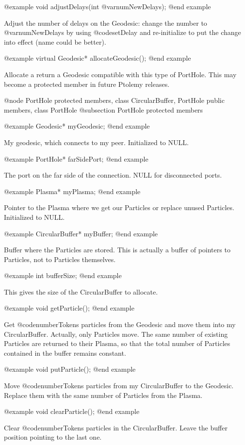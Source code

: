 @example
void adjustDelays(int @var{numNewDelays});
@end example

Adjust the number of delays on the Geodesic: change the number to
@var{numNewDelays} by using @code{setDelay} and re-initialize to
put the change into effect (name could be better).

@example
virtual Geodesic* allocateGeodesic();
@end example

Allocate a return a Geodesic compatible with this type of PortHole.
This may become a protected member in future Ptolemy releases.

@node PortHole protected members, class CircularBuffer, PortHole public members, class PortHole
@subsection PortHole protected members

@example
Geodesic* myGeodesic;
@end example

My geodesic, which connects to my peer.  Initialized to NULL.

@example
PortHole* farSidePort;
@end example

The port on the far side of the connection.  NULL for disconnected ports.

@example
Plasma* myPlasma;
@end example

Pointer to the Plasma where we get our Particles or replace unused
Particles.  Initialized to NULL.

@example
CircularBuffer* myBuffer;
@end example

Buffer where the Particles are stored.  This is actually a buffer of
pointers to Particles, not to Particles themselves.

@example
int bufferSize;
@end example

This gives the size of the CircularBuffer to allocate.

@example
void getParticle();
@end example

Get @code{numberTokens} particles from the Geodesic and move them into
my CircularBuffer.  Actually, only Particles move.  The same number of
existing Particles are returned to their Plasma, so that the total
number of Particles contained in the buffer remains constant.

@example
void putParticle();
@end example

Move @code{numberTokens} particles from my CircularBuffer to the
Geodesic.  Replace them with the same number of Particles from the Plasma.

@example
void clearParticle();
@end example

Clear @code{numberTokens} particles in the CircularBuffer.  Leave the
buffer position pointing to the last one.


